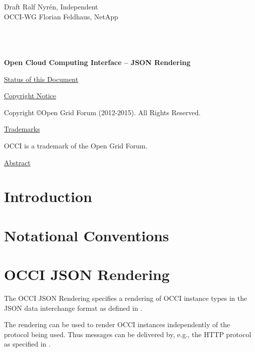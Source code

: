 \documentclass[10pt,a4paper]{article}
\begin{document}
\thispagestyle{empty}

Draft \hfill Ralf Nyrén, Independent \\
OCCI-WG \hfill Florian Feldhaus, NetApp\\
\\
\\
\\

\vspace*{0.5in}

\begin{Large}
\textbf{Open Cloud Computing Interface -- JSON Rendering}
\end{Large}

\vspace*{0.5in}

\underline{Status of this Document}



\underline{Copyright Notice}

Copyright \copyright Open Grid Forum (2012-2015). All Rights Reserved.

\underline{Trademarks}

OCCI is a trademark of the Open Grid Forum.

\underline{Abstract}



\newpage
\tableofcontents
\newpage

\section{Introduction}


\section{Notational Conventions}


\section{OCCI JSON Rendering}
\label{sec:json_format}
The OCCI JSON Rendering specifies a rendering of OCCI instance types in the JSON
data interchange format as defined in \cite{rfc4627}.

The rendering can be used to render OCCI instances independently of the
protocol being used. Thus messages can be delivered by, e.g., the HTTP
protocol as specified in \cite{occi:http_protocol}.
\end{document}
